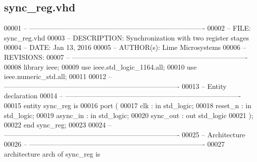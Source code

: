 \subsection{sync\+\_\+reg.\+vhd}
\label{sync__reg_8vhd_source}

\begin{DoxyCode}
00001 \textcolor{keyword}{-- ---------------------------------------------------------------------------- }
00002 \textcolor{keyword}{-- FILE:    sync\_reg.vhd}
00003 \textcolor{keyword}{-- DESCRIPTION: Synchronization with two register stages}
00004 \textcolor{keyword}{-- DATE:    Jan 13, 2016}
00005 \textcolor{keyword}{-- AUTHOR(s):   Lime Microsystems}
00006 \textcolor{keyword}{-- REVISIONS:}
00007 \textcolor{keyword}{-- ---------------------------------------------------------------------------- }
00008 \textcolor{vhdlkeyword}{library }\textcolor{keywordflow}{ieee};
00009 \textcolor{vhdlkeyword}{use }ieee.std\_logic\_1164.\textcolor{keywordflow}{all};
00010 \textcolor{vhdlkeyword}{use }ieee.numeric\_std.\textcolor{keywordflow}{all};
00011 
00012 \textcolor{keyword}{-- ----------------------------------------------------------------------------}
00013 \textcolor{keyword}{-- Entity declaration}
00014 \textcolor{keyword}{-- ----------------------------------------------------------------------------}
00015 \textcolor{keywordflow}{entity }sync_reg \textcolor{keywordflow}{is}
00016    \textcolor{keywordflow}{port} \textcolor{vhdlchar}{(}
00017       \textcolor{vhdlchar}{clk}         \textcolor{vhdlchar}{:} \textcolor{keywordflow}{in} \textcolor{comment}{std\_logic};
00018       \textcolor{vhdlchar}{reset_n}     \textcolor{vhdlchar}{:} \textcolor{keywordflow}{in} \textcolor{comment}{std\_logic};
00019       \textcolor{vhdlchar}{async_in}    \textcolor{vhdlchar}{:} \textcolor{keywordflow}{in} \textcolor{comment}{std\_logic};
00020       \textcolor{vhdlchar}{sync_out}    \textcolor{vhdlchar}{:} \textcolor{keywordflow}{out} \textcolor{comment}{std\_logic}
00021         \textcolor{vhdlchar}{)};
00022 \textcolor{keywordflow}{end} \textcolor{vhdlchar}{sync\_reg};
00023 
00024 \textcolor{keyword}{-- ----------------------------------------------------------------------------}
00025 \textcolor{keyword}{-- Architecture}
00026 \textcolor{keyword}{-- ----------------------------------------------------------------------------}
00027 \textcolor{keywordflow}{architecture} arch \textcolor{keywordflow}{of} sync_reg is

\end{DoxyCode}
